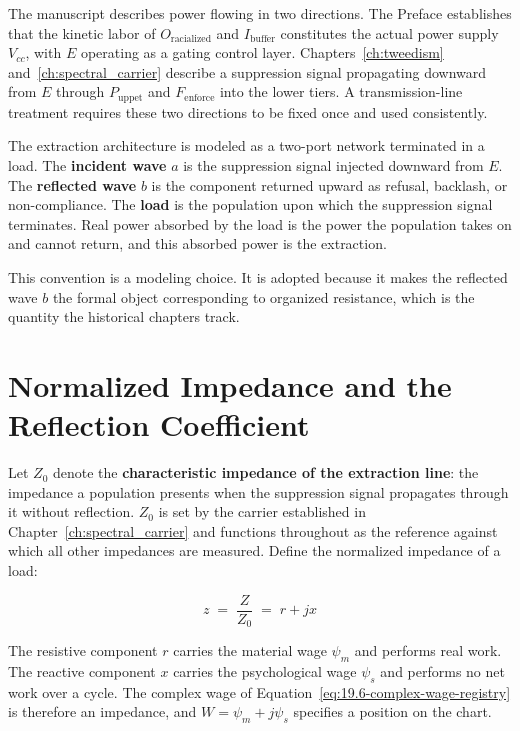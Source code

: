 The manuscript describes power flowing in two directions. The Preface establishes that the kinetic
labor of $O_{\text{racialized}}$ and $I_{\text{buffer}}$ constitutes the actual power supply
$V_{cc}$, with $E$ operating as a gating control layer. Chapters~\ref{ch:tweedism}
and~\ref{ch:spectral_carrier} describe a suppression signal propagating downward from $E$ through
$P_{\text{uppet}}$ and $F_{\text{enforce}}$ into the lower tiers. A transmission-line treatment
requires these two directions to be fixed once and used consistently.

\begin{definition}
The extraction architecture is modeled as a two-port network terminated in a load. The
\textbf{incident wave} $a$ is the suppression signal injected downward from $E$. The
\textbf{reflected wave} $b$ is the component returned upward as refusal, backlash, or
non-compliance. The \textbf{load} is the population upon which the suppression signal terminates.
Real power absorbed by the load is the power the population takes on and cannot return, and this
absorbed power is the extraction.
\end{definition}

This convention is a modeling choice. It is adopted because it makes the reflected wave $b$ the
formal object corresponding to organized resistance, which is the quantity the historical chapters
track.

\section{Normalized Impedance and the Reflection Coefficient}
\label{sec:xc_normalization}

Let $Z_0$ denote the \textbf{characteristic impedance of the extraction line}: the impedance a
population presents when the suppression signal propagates through it without reflection. $Z_0$ is
set by the carrier established in Chapter~\ref{ch:spectral_carrier} and functions throughout as the
reference against which all other impedances are measured. Define the normalized impedance of a
load:

\begin{equation}\label{eq:xc.1-normalized-impedance}
z \;=\; \frac{Z}{Z_0} \;=\; r + jx
\end{equation}

The resistive component $r$ carries the material wage $\psi_m$ and performs real work. The reactive
component $x$ carries the psychological wage $\psi_s$ and performs no net work over a cycle. The
complex wage of Equation~\ref{eq:19.6-complex-wage-registry} is therefore an impedance, and
$W = \psi_m + j\psi_s$ specifies a position on the chart.

